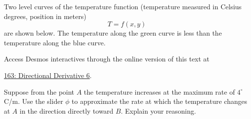 \documentclass{ximera}
\begin{document}
\begin{question}  \label{Q354fgtr4t4}
Two level curves of the temperature function (temperature measured in Celsius degrees, position in meters)
\[
 T = f(x,y)
\]
are shown below. The temperature along the green curve is less than the temperature along the blue curve.
\begin{onlineOnly}
    \begin{center}
\end{center}
\end{onlineOnly}

Access Desmos interactives through the online version of this text at
 
\href{https://www.desmos.com/calculator/brp7vx683x}{163: Directional Derivative 6}.

Suppose from the point $A$ the temperature increases at the maximum rate of $4^\circ$C/m. Use the slider $\phi$ to approximate the rate at which the temperature changes at $A$ in the direction directly toward $B$. Explain your reasoning.


\end{question}
\end{document}
